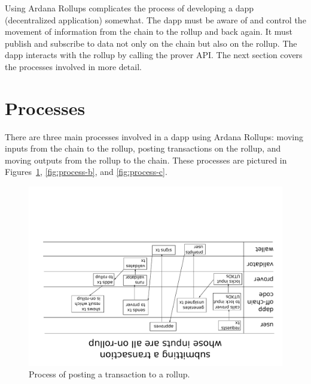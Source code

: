 \documentclass[12pt]{article}
\begin{document}
Using Ardana Rollups complicates the process of developing a dapp (decentralized application) somewhat. The dapp must be aware of and control the movement of information from the chain to the rollup and back again. It must publish and subscribe to data not only on the chain but also on the rollup. The dapp interacts with the rollup by calling the prover API. The next section covers the processes involved in more detail.


\section{Processes}

There are three main processes involved in a dapp using Ardana Rollups: moving inputs from the chain to the rollup, posting transactions on the rollup, and moving outputs from the rollup to the chain. These processes are pictured in Figures~\ref{fig:process-a}, \ref{fig:process-b}, and \ref{fig:process-c}.

\begin{figure}
	\includegraphics[angle=180,width=1.0\columnwidth]{process-diagram-a.pdf}
	\caption{Process of posting a transaction to a rollup.}
	\label{fig:process-a}
\end{figure}
\end{document}
